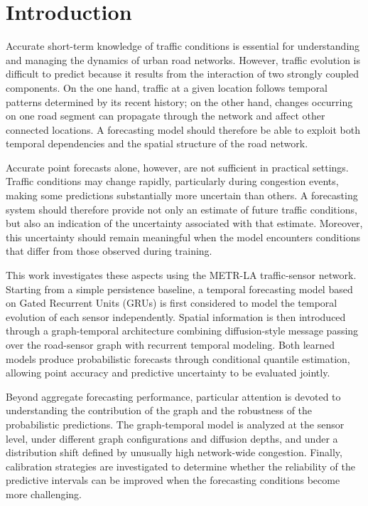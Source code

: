 \section{Introduction}
\label{sec:introduction}

Accurate short-term knowledge of traffic conditions is essential for
understanding and managing the dynamics of urban road networks.
However, traffic evolution is difficult to predict because it results from
the interaction of two strongly coupled components. On the one hand, traffic
at a given location follows temporal patterns determined by its recent
history; on the other hand, changes occurring on one road segment can
propagate through the network and affect other connected locations. A
forecasting model should therefore be able to exploit both temporal
dependencies and the spatial structure of the road network.

Accurate point forecasts alone, however, are not sufficient in practical
settings. Traffic conditions may change rapidly, particularly during
congestion events, making some predictions substantially more uncertain than
others. A forecasting system should therefore provide not only an estimate of
future traffic conditions, but also an indication of the uncertainty
associated with that estimate. Moreover, this uncertainty should remain
meaningful when the model encounters conditions that differ from those
observed during training.

This work investigates these aspects using the METR-LA traffic-sensor
network. Starting from a simple persistence baseline, a temporal forecasting
model based on Gated Recurrent Units (GRUs) is first considered to model the
temporal evolution of each sensor independently. Spatial information is then
introduced through a graph-temporal architecture combining diffusion-style
message passing over the road-sensor graph with recurrent temporal modeling.
Both learned models produce probabilistic forecasts through conditional
quantile estimation, allowing point accuracy and predictive uncertainty to be
evaluated jointly.

Beyond aggregate forecasting performance, particular attention is devoted to
understanding the contribution of the graph and the robustness of the
probabilistic predictions. The graph-temporal model is analyzed at the sensor
level, under different graph configurations and diffusion depths, and under a
distribution shift defined by unusually high network-wide congestion.
Finally, calibration strategies are investigated to determine whether the
reliability of the predictive intervals can be improved when the forecasting
conditions become more challenging.


